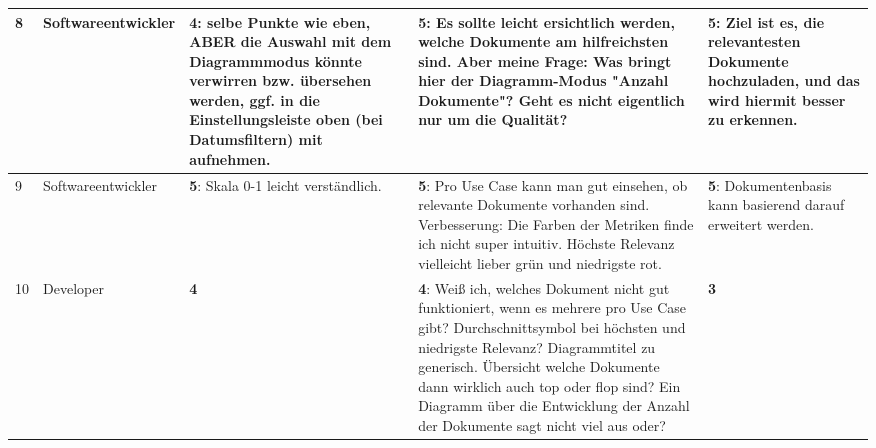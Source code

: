 \documentclass[
	english,
	ruledheaders=section,%
	class=report,%
	thesis={type=bachelor},%
	accentcolor=1b,%
	custommargins=true,%
	marginpar=false,%
	parskip=half-,%
	fontsize=11pt,%
	DIV=14,
]{tudapub}
\begin{document}
\begin{longtable}{l >{\RaggedRight}p{3cm} >{\RaggedRight}p{3.5cm} >{\RaggedRight}p{3.5cm} >{\RaggedRight}p{3.5cm}}
    \midrule
    8 & Softwareentwickler & \textbf{4}: selbe Punkte wie eben, ABER die Auswahl mit dem Diagrammmodus könnte verwirren bzw. übersehen werden, ggf. in die Einstellungsleiste oben (bei Datumsfiltern) mit aufnehmen. & \textbf{5}: Es sollte leicht ersichtlich werden, welche Dokumente am hilfreichsten sind. Aber meine Frage: Was bringt hier der Diagramm-Modus "Anzahl Dokumente"? Geht es nicht eigentlich nur um die Qualität? & \textbf{5}: Ziel ist es, die relevantesten Dokumente hochzuladen, und das wird hiermit besser zu erkennen. \\
    \midrule
    9 & Softwareentwickler & \textbf{5}: Skala 0-1 leicht verständlich. & \textbf{5}: Pro Use Case kann man gut einsehen, ob relevante Dokumente vorhanden sind. Verbesserung: Die Farben der Metriken finde ich nicht super intuitiv. Höchste Relevanz vielleicht lieber grün und niedrigste rot. & \textbf{5}: Dokumentenbasis kann basierend darauf erweitert werden. \\
    \midrule
    10 & Developer & \textbf{4} & \textbf{4}: Weiß ich, welches Dokument nicht gut funktioniert, wenn es mehrere pro Use Case gibt? Durchschnittsymbol bei höchsten und niedrigste Relevanz? Diagrammtitel zu generisch. Übersicht welche Dokumente dann wirklich auch top oder flop sind? Ein Diagramm über die Entwicklung der Anzahl der Dokumente sagt nicht viel aus oder? & \textbf{3} \\
\end{longtable}

\clearpage
\end{document}
